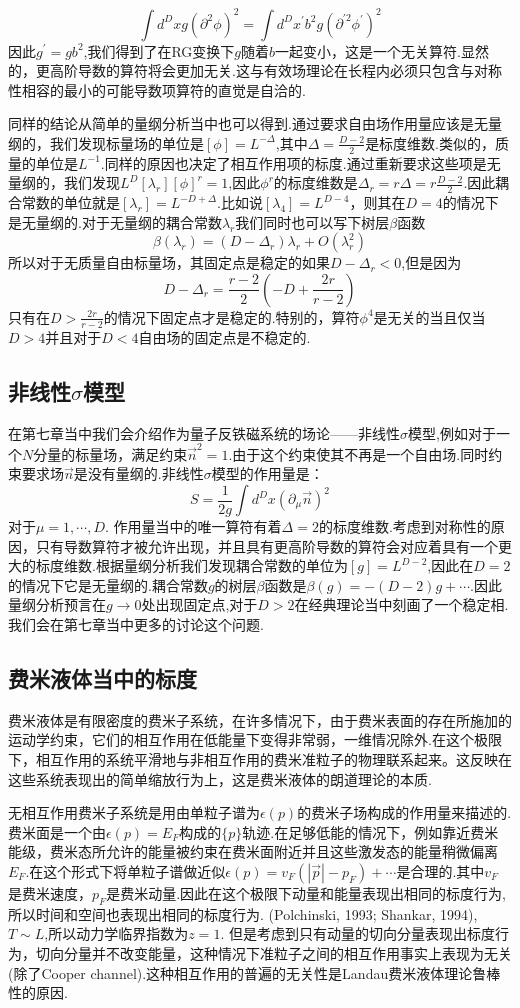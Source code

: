 \documentclass{ctexart}
\begin{document}
$$\int d^D xg(\partial^2\phi)^2=\int d^D x^\prime b^2g(\partial^{\prime2}\phi^\prime)^2$$
因此$g^\prime=gb^2$,我们得到了在RG变换下$g$随着$b$一起变小，这是一个无关算符.显然的，更高阶导数的算符将会更加无关.这与有效场理论在长程内必须只包含与对称性相容的最小的可能导数项算符的直觉是自洽的.\par 
同样的结论从简单的量纲分析当中也可以得到.通过要求自由场作用量应该是无量纲的，我们发现标量场的单位是$[\phi]=L^{-\Delta}$,其中$\Delta=\frac{D-2}{2}$是标度维数.类似的，质量的单位是$L^{-1}$.同样的原因也决定了相互作用项的标度.通过重新要求这些项是无量纲的，我们发现$L^D[\lambda_r][\phi]^r=1$,因此$\phi^r$的标度维数是$\Delta_r=r\Delta=r\frac{D-2}{2}$.因此耦合常数的单位就是$[\lambda_r]=L^{-D+\Delta}$.比如说$[\lambda_4]=L^{D-4}$，则其在$D=4$的情况下是无量纲的.对于无量纲的耦合常数$\lambda_r$我们同时也可以写下树层$\beta$函数
$$\beta(\lambda_r)=(D-\Delta_r)\lambda_r+O(\lambda_r^2)$$
所以对于无质量自由标量场，其固定点是稳定的如果$D-\Delta_r<0$,但是因为
$$D-\Delta_r=\frac{r-2}{2}\left(-D+\frac{2r}{r-2}\right)$$
只有在$D>\frac{2r}{r-2}$的情况下固定点才是稳定的.特别的，算符$\phi^4$是无关的当且仅当$D>4$并且对于$D<4$自由场的固定点是不稳定的.
\subsection{非线性$\sigma$模型}
在第七章当中我们会介绍作为量子反铁磁系统的场论——非线性$\sigma$模型,例如对于一个$N$分量的标量场，满足约束$\vec{n}^2=1$.由于这个约束使其不再是一个自由场.同时约束要求场$\vec{n}$是没有量纲的.非线性$\sigma$模型的作用量是：
$$S=\frac{1}{2g}\int d^D x(\partial_\mu \vec{n})^2$$
对于$\mu=1,\cdots, D$. 作用量当中的唯一算符有着$\Delta=2$的标度维数.考虑到对称性的原因，只有导数算符才被允许出现，并且具有更高阶导数的算符会对应着具有一个更大的标度维数.根据量纲分析我们发现耦合常数的单位为$[g]=L^{D-2}$,因此在$D=2$的情况下它是无量纲的.耦合常数$g$的树层$\beta$函数是$\beta(g)=-(D-2)g+\cdots$.因此量纲分析预言在$g\rightarrow 0$处出现固定点,对于$D>2$在经典理论当中刻画了一个稳定相.我们会在第七章当中更多的讨论这个问题.\par 
\subsection{费米液体当中的标度}
费米液体是有限密度的费米子系统，在许多情况下，由于费米表面的存在所施加的运动学约束，它们的相互作用在低能量下变得非常弱，一维情况除外.在这个极限下，相互作用的系统平滑地与非相互作用的费米准粒子的物理联系起来。这反映在这些系统表现出的简单缩放行为上，这是费米液体的朗道理论的本质.\par 
无相互作用费米子系统是用由单粒子谱为$\epsilon(p)$的费米子场构成的作用量来描述的.费米面是一个由$\epsilon(p)=E_F$构成的$\{p\}$轨迹.在足够低能的情况下，例如靠近费米能级，费米态所允许的能量被约束在费米面附近并且这些激发态的能量稍微偏离$E_F$.在这个形式下将单粒子谱做近似$\epsilon(p)=v_F(|\vec{p}|-p_F)+\cdots$是合理的.其中$v_F$是费米速度，$p_F$是费米动量.因此在这个极限下动量和能量表现出相同的标度行为,所以时间和空间也表现出相同的标度行为. (Polchinski, 1993; Shankar, 1994),$T\sim L$,所以动力学临界指数为$z=1$. 但是考虑到只有动量的切向分量表现出标度行为，切向分量并不改变能量，这种情况下准粒子之间的相互作用事实上表现为无关(除了Cooper channel).这种相互作用的普遍的无关性是Landau费米液体理论鲁棒性的原因.
\end{document}
